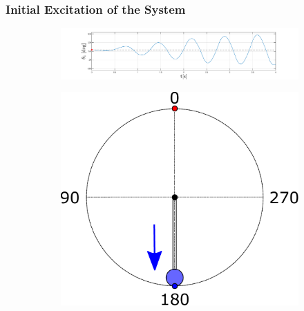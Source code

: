 \documentclass[]{beamer}
\begin{document}
\begin{frame}
	\frametitle{Initial Excitation of the System}
	\begin{figure}[H]
		\centering
		\begin{subfigure}
			\centering
			\includegraphics[scale=0.25]{images/swings2/swing1.pdf}  
		\end{subfigure}
		\begin{subfigure}
			\centering
			\includegraphics[scale=0.25]{images/OP2.pdf}  
		\end{subfigure}
	\end{figure}
\end{frame}
\end{document}
